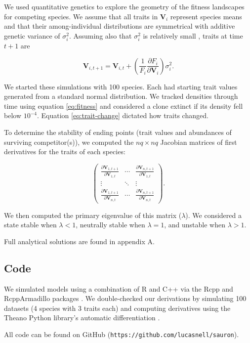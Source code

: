 We used quantitative genetics to explore the geometry of the fitness landscapes for
competing species.
We assume that all traits in $\mathbf{V}_i$ represent species means and that their
among-individual distributions are symmetrical with additive genetic variance
of $\sigma^2_i$.
Assuming also that $\sigma^2_i$ is relatively small
\citep{Iwasa:1991eo,Abrams:2001va,Abrams:1993cr}, traits at time $t+1$ are

\begin{equation} \label{eq:trait-change}
    \mathbf{V}_{i,t+1} = \mathbf{V}_{i,t} + \left( \frac{1}{F_i}
        \frac{\partial F_i}{\partial \mathbf{V}_{i}} \right) \sigma^2_i
    \textrm{.}
\end{equation}

We started these simulations with 100 species.
Each had starting trait values generated from a standard normal distribution.
We tracked densities through time using equation \ref{eq:fitness} and
considered a clone extinct if its density fell below $10^{-4}$.
Equation \ref{eq:trait-change} dictated how traits changed.

To determine the stability of ending points (trait values and abundances of surviving
competitor(s)), we computed the $nq \times nq$ Jacobian matrices of first derivatives
for the traits of each species:

\begin{equation} \label{eq:jacobian}
    \begin{pmatrix}
        \frac{\partial \mathbf{V}_{1,t+1}}{\partial \mathbf{V}_{1,t}} & \cdots & 
            \frac{\partial \mathbf{V}_{n,t+1}}{\partial \mathbf{V}_{1,t}} \\
        \vdots & \ddots & \vdots \\
        \frac{\partial \mathbf{V}_{1,t+1}}{\partial \mathbf{V}_{n,t}} & \cdots & 
            \frac{\partial \mathbf{V}_{n,t+1}}{\partial \mathbf{V}_{n,t}}
    \end{pmatrix}
    \textrm{.}
\end{equation}

We then computed the primary eigenvalue of this matrix ($\lambda$).
We considered a state stable when $\lambda < 1$,
neutrally stable when $\lambda = 1$,
and unstable when $\lambda > 1$.

Full analytical solutions are found in appendix A.


\subsection*{Code}

We simulated models using a combination of R \citep{RCoreTeam:2018wf} and
C++ via the Rcpp and RcppArmadillo packages
\citep{Eddelbuettel:2014ad,Eddelbuettel:2013if,Sanderson:2016cs}.
We double-checked our derivations by simulating 100 datasets
(4 species with 3 traits each) and computing derivatives using the Theano Python
library's automatic differentiation \citep{TheanoDevelopmentTeam:2016uc}.

All code can be found on GitHub
(\texttt{https://github.com/lucasnell/sauron}).

